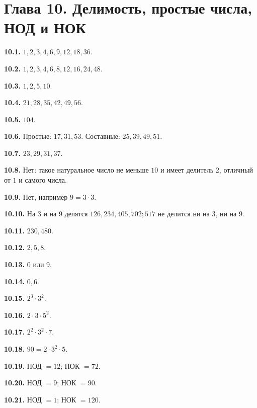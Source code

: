 \documentclass[12pt,a4paper,oneside,openany]{book}
\theoremstyle{colordef}\newtheorem{definition}{Определение}[chapter]
\theoremstyle{plain}\newtheorem{theorem}{Теорема}[chapter]
\theoremstyle{definition}\newtheorem{axiom}{Аксиома}[chapter]
\begin{document}
\section*{Глава 10. Делимость, простые числа, НОД и НОК}
\begingroup\setlength{\parskip}{3pt}
\textbf{10.1.} \(1,\allowbreak 2,\allowbreak 3,\allowbreak 4,\allowbreak 6,\allowbreak 9,\allowbreak 12,\allowbreak 18,\allowbreak 36\).\par
\textbf{10.2.} \(1,\allowbreak 2,\allowbreak 3,\allowbreak 4,\allowbreak 6,\allowbreak 8,\allowbreak 12,\allowbreak 16,\allowbreak 24,\allowbreak 48\).\par
\textbf{10.3.} \(1,\allowbreak 2,\allowbreak 5,\allowbreak 10\).\par
\textbf{10.4.} \(21,\allowbreak 28,\allowbreak 35,\allowbreak 42,\allowbreak 49,\allowbreak 56\).\par
\textbf{10.5.} \(104\).\par
\textbf{10.6.} Простые: \(17,\allowbreak 31,\allowbreak 53\). Составные: \(25,\allowbreak 39,\allowbreak 49,\allowbreak 51\).\par
\textbf{10.7.} \(23,\allowbreak 29,\allowbreak 31,\allowbreak 37\).\par
\textbf{10.8.} Нет: такое натуральное число не меньше \(10\) и имеет делитель \(2\), отличный от \(1\) и самого числа.\par
\textbf{10.9.} Нет, например \(9 = 3 \cdot  3\).\par
\textbf{10.10.} На \(3\) и на \(9\) делятся \(126,\allowbreak 234,\allowbreak 405,\allowbreak 702;\allowbreak 517\) не делится ни на \(3\), ни на \(9\).\par
\textbf{10.11.} \(230,\allowbreak 480\).\par
\textbf{10.12.} \(2,\allowbreak 5,\allowbreak 8\).\par
\textbf{10.13.} \(0\) или \(9\).\par
\textbf{10.14.} \(0,\allowbreak 6\).\par
\textbf{10.15.} \(2^{3} \cdot  3^{2}\).\par
\textbf{10.16.} \(2 \cdot  3 \cdot  5^{2}\).\par
\textbf{10.17.} \(2^{2} \cdot  3^{2} \cdot  7\).\par
\textbf{10.18.} \(90 = 2 \cdot  3^{2} \cdot  5\).\par
\textbf{10.19.} НОД \(= 12\); НОК \(= 72\).\par
\textbf{10.20.} НОД \(= 9\); НОК \(= 90\).\par
\textbf{10.21.} НОД \(= 1\); НОК \(= 120\).\par
\end{document}
